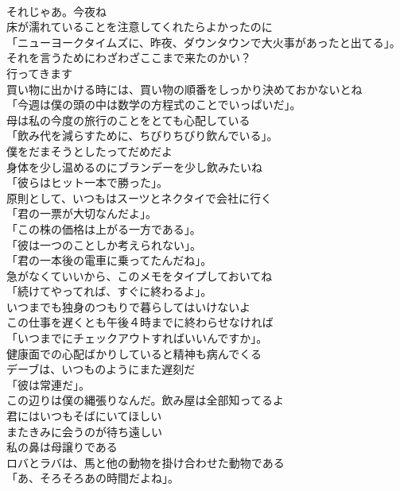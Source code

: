 \documentclass[8pt]{extreport}
\begin{document}
\begin{CJK}{UTF8}{min}
\\	それじゃあ。今夜ね	
\\	床が濡れていることを注意してくれたらよかったのに	
\\	「ニューヨークタイムズに、昨夜、ダウンタウンで大火事があったと出てる」。	
\\	それを言うためにわざわざここまで来たのかい？	
\\	行ってきます	
\\	買い物に出かける時には、買い物の順番をしっかり決めておかないとね	
\\	「今週は僕の頭の中は数学の方程式のことでいっぱいだ」。	
\\	母は私の今度の旅行のことをとても心配している	
\\	「飲み代を減らすために、ちびりちびり飲んでいる」。	
\\	僕をだまそうとしたってだめだよ	
\\	身体を少し温めるのにブランデーを少し飲みたいね	
\\	「彼らはヒット一本で勝った」。	
\\	原則として、いつもはスーツとネクタイで会社に行く	
\\	「君の一票が大切なんだよ」。	
\\	「この株の価格は上がる一方である」。	
\\	「彼は一つのことしか考えられない」。	
\\	「君の一本後の電車に乗ってたんだね」。	
\\	急がなくていいから、このメモをタイプしておいてね	
\\	「続けてやってれば、すぐに終わるよ」。	
\\	いつまでも独身のつもりで暮らしてはいけないよ	
\\	この仕事を遅くとも午後４時までに終わらせなければ	
\\	「いつまでにチェックアウトすればいいんですか」。	
\\	健康面での心配ばかりしていると精神も病んでくる	
\\	デーブは、いつものようにまた遅刻だ	
\\	「彼は常連だ」。	
\\	この辺りは僕の縄張りなんだ。飲み屋は全部知ってるよ	
\\	君にはいつもそばにいてほしい	
\\	またきみに会うのが待ち遠しい	
\\	私の鼻は母譲りである	
\\	ロバとラバは、馬と他の動物を掛け合わせた動物である	
\\	「あ、そろそろあの時間だよね」。	

\end{CJK}
\end{document}
